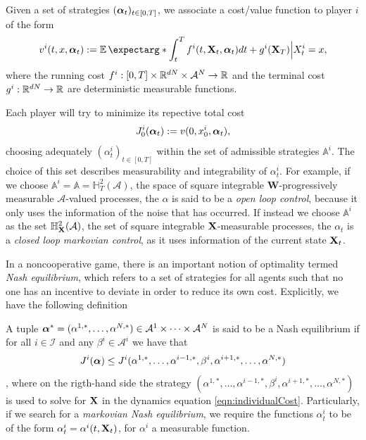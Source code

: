 Given a set of strategies $(\bm{\alpha}_t)_{t\in [0,T]}$, we associate a cost/value function to player $i$ of the form
\begin{equation}
	\label{eqn:individualCost}
	v^i(t,x,\bfAlp_t):=\expect*{\int_{t}^{T}f^i(t,\bfX_t,\bfAlp_t)dt +g^i(\bfX_T)\Big| X_t^i=x},
\end{equation}
where the running cost $f^i:[0,T]\times \mathbb{R}^{dN}\times \mathcal{A}^N\to \mathbb{R}$ and the terminal cost $g^i:\mathbb{R}^{dN}\to \mathbb{R}$ are deterministic measurable functions.

Each player will try to minimize its repective total cost
\begin{equation}
	\label{eqn:total_cost}
	J^i_0(\bm{\alpha}_t):=v(0,x^i_0,\bm{\alpha}_t),
\end{equation}  choosing adequately $(\alpha^{i}_t)_{t\in[0,T]}$ within the set of admissible strategies $\mathbb{A}^i$. The choice of this set describes measurability and integrability of $\alpha_t^i$. For example, if we choose $\mathbb{A}^i=\mathbb{A}=\mathbb{H}^2_T(\mathcal{A})$, the space of square integrable $\bm{W}$-progressively measurable $\mathcal{A}$-valued processes, the $\alpha$ is said to be a \textit{open loop control}, because it only uses the information of the noise that has occurred. If instead we choose $\mathbb{A}^i$ as the set $\mathbb{H}_{\mathbf{X}}^2(\mathcal{A})$, the set of square integrable  $\mathbf{X}$-measurable processes, the $\alpha_t$ is a \textit{closed loop markovian control}, as it uses information of the current state $\mathbf{X}_t$.

In a noncooperative game, there is an important notion of optimality termed \textit{Nash equilibrium}, which refers to a set of strategies for all agents such that no one has an incentive to deviate in order to reduce its own cost. Explicitly, we have the following definition
\begin{definition}
A tuple $\bm{\alpha}^*=(\alpha^{1,*},\ldots,\alpha^{N,*})\in \mathcal{A}^1\times \cdots \times \mathcal{A}^N$ is said to be a Nash equilibrium if for all $i\in\mathcal{I}$ and any $\beta^i\in\mathcal{A}^i$ we have that
 $$J^{i}(\bm{\alpha})\leq J^i(\alpha^{1,*},\ldots,\alpha^{i-1,*},\beta^i,\alpha^{i+1,*},\ldots ,\alpha^{N,*})$$,
 where on the rigth-hand side the strategy $(\alpha^{1,*},\ldots,\alpha^{i-1,*},\beta^i,\alpha^{i+1,*},\ldots ,\alpha^{N,*})$ is used to solve for $\mathbf{X}$ in the dynamics equation \eqref{eqn:individualCost}. Particularly, if we search for a \textit{markovian Nash equilibrium}, we require the functions $\alpha^i_t$ to be of the form $\alpha^i_t=\alpha^i(t,\mathbf{X}_t)$, for $\alpha^i$ a measurable function.  
\end{definition}

